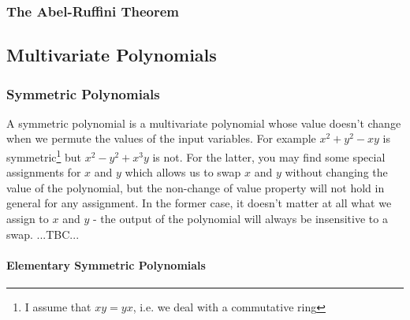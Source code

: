 \subsubsection{The Abel-Ruffini Theorem} 


\subsection{Multivariate Polynomials}


\subsubsection{Symmetric Polynomials}
A symmetric polynomial is a multivariate polynomial whose value doesn't change when we permute the values of the input variables. For example $x^2 + y^2 - xy$ is symmetric\footnote{I assume that $xy = yx$, i.e. we deal with a commutative ring} but  $x^2 - y^2 + x^3 y$ is not. For the latter, you may find some special assignments for $x$ and $y$ which allows us to swap $x$ and $y$ without changing the value of the polynomial, but the non-change of value property will not hold in general for any assignment. In the former case, it doesn't matter at all what we assign to $x$ and $y$ - the output of the polynomial will always be insensitive to a swap. ...TBC...


\paragraph{Elementary Symmetric Polynomials}


